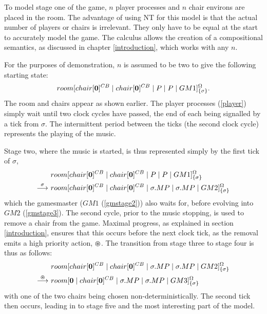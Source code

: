To model stage one of the game, $n$ player processes and $n$ chair
environs are placed in the room.  The advantage of using NT for this
model is that the actual number of players or chairs is irrelevant.
They only have to be equal at the start to accurately model the game.
The calculus allows the creation of a compositional semantics, as
discussed in chapter \ref{introduction}, which works with any $n$.

For the purposes of demonstration, $n$ is assumed to be two to give the
following starting state:
\begin{equation}
  {room}[ {chair}[ \textbf{0} ]^{CB} \;|\; {chair}[ \textbf{0} ]^{CB} \;|\; 
   P \;|\; P \;|\; GM1 ]^{\Omega}_{\{\sigma\}}.
\end{equation}
The room and chairs appear as shown earlier.  The player
processes (\ref{player}) simply wait until two clock
cycles have passed, the end of each being signalled by a tick from
$\sigma$.  The intermittent period between the ticks (the second clock
cycle) represents the playing of the music.  

Stage two, where the music is started, is thus represented simply by the
first tick of $\sigma$,
\begin{equation}
\begin{aligned}
  & {room}[ {chair}[ \textbf{0} ]^{CB} \;|\; {chair}[ \textbf{0} ]^{CB} \;|\; 
   P \;|\; P \;|\;
   GM1 ]^{\Omega}_{\{\sigma\}} \\
 \stackrel{\sigma}{\longrightarrow}\ & {room}[ {chair}[ \textbf{0} ]^{CB} \;|\; {chair}[ \textbf{0} ]^{CB} \;|\; 
   \sigma.MP \;|\; \sigma.MP \;|\;
   GM2 ]^{\Omega}_{\{\sigma\}}
\end{aligned}
\end{equation}
which the gamesmaster ($GM1$ (\ref{gmstage2})) also waits for, before
evolving into $GM2$ (\ref{gmstage3}).  The second cycle, prior to the
music stopping, is used to remove a chair from the game.  Maximal
progress, as explained in section \ref{introduction}, ensures that this
occurs before the next clock tick, as the removal emits a high priority
action, $\varoast$.  The transition from stage three to stage four is thus
as follows:
\begin{equation}
\begin{aligned}
& {room}[ {chair}[ \textbf{0} ]^{CB} \;|\; {chair}[ \textbf{0} ]^{CB} \;|\; 
   \sigma.MP \;|\; \sigma.MP \;|\;
   GM2 ]^{\Omega}_{\{\sigma\}} \\
 \stackrel{\varoast}{\longrightarrow}\ & {room}[ \textbf{0} \;|\; {chair}[ \textbf{0} ]^{CB} \;|\; 
   \sigma.MP \;|\; \sigma.MP \;|\;
   GM3 ]^{\Omega}_{\{\sigma\}}
\end{aligned}
\end{equation}
with one of the two chairs being chosen non-deterministically.
The second tick then occurs, leading in to stage five and the most
interesting part of the model.

